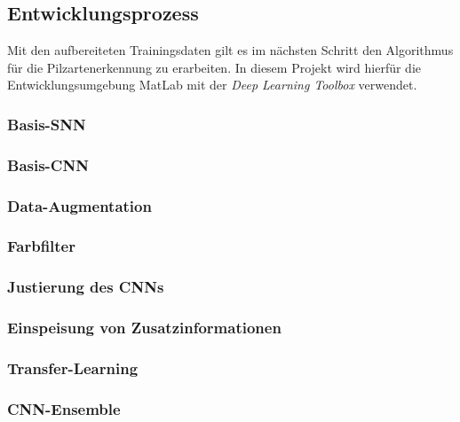 
\subsection{Entwicklungsprozess}\label{cha:met:dev}
Mit den aufbereiteten Trainingsdaten gilt es im nächsten Schritt den Algorithmus für die Pilzartenerkennung zu erarbeiten. In diesem Projekt wird hierfür die Entwicklungsumgebung MatLab mit der \textit{Deep Learning Toolbox} verwendet.

\subsubsection{Basis-SNN}

\subsubsection{Basis-CNN}

\subsubsection{Data-Augmentation}

\subsubsection{Farbfilter}

\subsubsection{Justierung des CNNs}

\subsubsection{Einspeisung von Zusatzinformationen}

\subsubsection{Transfer-Learning}

\subsubsection{CNN-Ensemble}